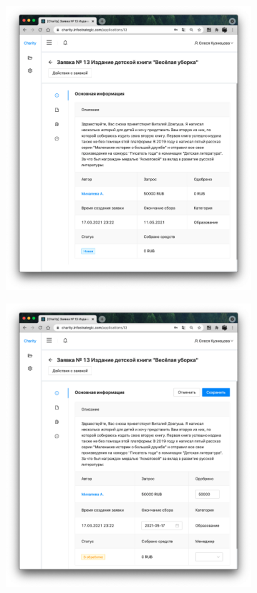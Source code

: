 \documentclass[a4paper,12pt,reqno]{article}
\begin{document}
	
	\begin{figure}[H]
		\centering
		\begin{subfigure}[b]{0.475\linewidth}
			\includegraphics[width=\linewidth]{img/ro/application.png}
		\end{subfigure}
		\begin{subfigure}[b]{0.475\linewidth}
			\includegraphics[width=\linewidth]{img/ro/application_edit.png}

\end{subfigure}
\end{figure}
\end{document}

